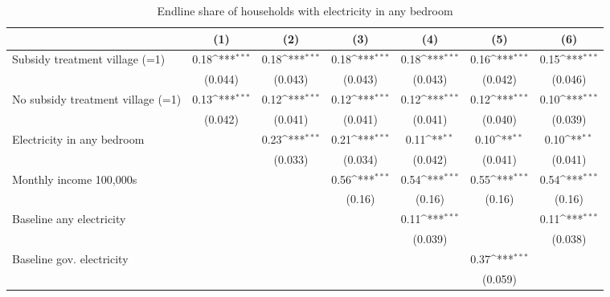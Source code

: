 \begin{table}[htbp]\centering
\def\sym#1{\ifmmode^{#1}\else\(^{#1}\)\fi}
\caption{Endline share of households with electricity in any bedroom}
\begin{tabular*}{1\hsize}{@{\hskip\tabcolsep\extracolsep\fill}l*{6}{c}}
\toprule
                &\multicolumn{1}{c}{(1)}         &\multicolumn{1}{c}{(2)}         &\multicolumn{1}{c}{(3)}         &\multicolumn{1}{c}{(4)}         &\multicolumn{1}{c}{(5)}         &\multicolumn{1}{c}{(6)}         \\
\midrule
Subsidy treatment village (=1)&     0.18\sym{***}&     0.18\sym{***}&     0.18\sym{***}&     0.18\sym{***}&     0.16\sym{***}&     0.15\sym{***}\\
                &  (0.044)         &  (0.043)         &  (0.043)         &  (0.043)         &  (0.042)         &  (0.046)         \\
No subsidy treatment village (=1)&     0.13\sym{***}&     0.12\sym{***}&     0.12\sym{***}&     0.12\sym{***}&     0.12\sym{***}&     0.10\sym{***}\\
                &  (0.042)         &  (0.041)         &  (0.041)         &  (0.041)         &  (0.040)         &  (0.039)         \\
Electricity in any bedroom&                  &     0.23\sym{***}&     0.21\sym{***}&     0.11\sym{**} &     0.10\sym{**} &     0.10\sym{**} \\
                &                  &  (0.033)         &  (0.034)         &  (0.042)         &  (0.041)         &  (0.041)         \\
Monthly income 100,000s&                  &                  &     0.56\sym{***}&     0.54\sym{***}&     0.55\sym{***}&     0.54\sym{***}\\
                &                  &                  &   (0.16)         &   (0.16)         &   (0.16)         &   (0.16)         \\
Baseline any electricity&                  &                  &                  &     0.11\sym{***}&                  &     0.11\sym{***}\\
                &                  &                  &                  &  (0.039)         &                  &  (0.038)         \\
Baseline gov. electricity&                  &                  &                  &                  &     0.37\sym{***}&                  \\
                &                  &                  &                  &                  &  (0.059)         &                  \\

\end{tabular*}
\end{table}
